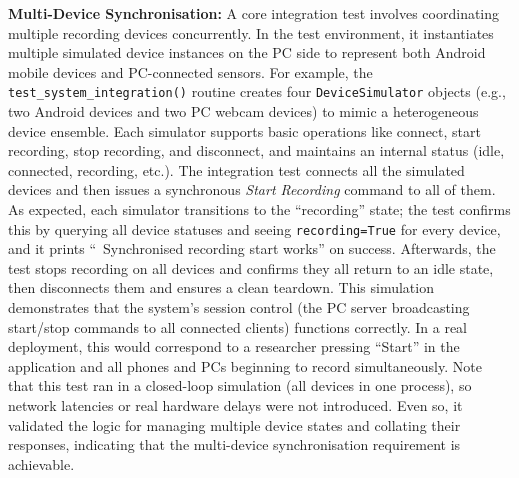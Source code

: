 \textbf{Multi-Device Synchronisation:} A core integration test involves coordinating multiple recording devices concurrently. In the test environment, it instantiates multiple simulated device instances on the PC side to represent both Android mobile devices and PC-connected sensors. For example, the \texttt{test\_system\_integration()} routine creates four \texttt{DeviceSimulator} objects (e.g., two Android devices and two PC webcam devices) to mimic a heterogeneous device ensemble. Each simulator supports basic operations like connect, start recording, stop recording, and disconnect, and maintains an internal status (idle, connected, recording, etc.). The integration test connects all the simulated devices and then issues a synchronous \emph{Start Recording} command to all of them. As expected, each simulator transitions to the ``recording'' state; the test confirms this by querying all device statuses and seeing \texttt{recording=True} for every device, and it prints ``\checkmark\ Synchronised recording start works'' on success. Afterwards, the test stops recording on all devices and confirms they all return to an idle state, then disconnects them and ensures a clean teardown. This simulation demonstrates that the system's session control (the PC server broadcasting start/stop commands to all connected clients) functions correctly. In a real deployment, this would correspond to a researcher pressing ``Start'' in the application and all phones and PCs beginning to record simultaneously. Note that this test ran in a closed-loop simulation (all devices in one process), so network latencies or real hardware delays were not introduced. Even so, it validated the logic for managing multiple device states and collating their responses, indicating that the multi-device synchronisation requirement is achievable.

